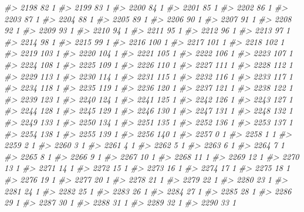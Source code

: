 \documentclass[]{article}
\newenvironment{Shaded}{\begin{snugshade}}{\end{snugshade}}
\newcommand{\CommentTok}[1]{\textcolor[rgb]{0.56,0.35,0.01}{\textit{#1}}}
\begin{document}
\begin{Shaded}
\begin{Highlighting}[]
\CommentTok{#> 2198  82  1}
\CommentTok{#> 2199  83  1}
\CommentTok{#> 2200  84  1}
\CommentTok{#> 2201  85  1}
\CommentTok{#> 2202  86  1}
\CommentTok{#> 2203  87  1}
\CommentTok{#> 2204  88  1}
\CommentTok{#> 2205  89  1}
\CommentTok{#> 2206  90  1}
\CommentTok{#> 2207  91  1}
\CommentTok{#> 2208  92  1}
\CommentTok{#> 2209  93  1}
\CommentTok{#> 2210  94  1}
\CommentTok{#> 2211  95  1}
\CommentTok{#> 2212  96  1}
\CommentTok{#> 2213  97  1}
\CommentTok{#> 2214  98  1}
\CommentTok{#> 2215  99  1}
\CommentTok{#> 2216 100  1}
\CommentTok{#> 2217 101  1}
\CommentTok{#> 2218 102  1}
\CommentTok{#> 2219 103  1}
\CommentTok{#> 2220 104  1}
\CommentTok{#> 2221 105  1}
\CommentTok{#> 2222 106  1}
\CommentTok{#> 2223 107  1}
\CommentTok{#> 2224 108  1}
\CommentTok{#> 2225 109  1}
\CommentTok{#> 2226 110  1}
\CommentTok{#> 2227 111  1}
\CommentTok{#> 2228 112  1}
\CommentTok{#> 2229 113  1}
\CommentTok{#> 2230 114  1}
\CommentTok{#> 2231 115  1}
\CommentTok{#> 2232 116  1}
\CommentTok{#> 2233 117  1}
\CommentTok{#> 2234 118  1}
\CommentTok{#> 2235 119  1}
\CommentTok{#> 2236 120  1}
\CommentTok{#> 2237 121  1}
\CommentTok{#> 2238 122  1}
\CommentTok{#> 2239 123  1}
\CommentTok{#> 2240 124  1}
\CommentTok{#> 2241 125  1}
\CommentTok{#> 2242 126  1}
\CommentTok{#> 2243 127  1}
\CommentTok{#> 2244 128  1}
\CommentTok{#> 2245 129  1}
\CommentTok{#> 2246 130  1}
\CommentTok{#> 2247 131  1}
\CommentTok{#> 2248 132  1}
\CommentTok{#> 2249 133  1}
\CommentTok{#> 2250 134  1}
\CommentTok{#> 2251 135  1}
\CommentTok{#> 2252 136  1}
\CommentTok{#> 2253 137  1}
\CommentTok{#> 2254 138  1}
\CommentTok{#> 2255 139  1}
\CommentTok{#> 2256 140  1}
\CommentTok{#> 2257   0  1}
\CommentTok{#> 2258   1  1}
\CommentTok{#> 2259   2  1}
\CommentTok{#> 2260   3  1}
\CommentTok{#> 2261   4  1}
\CommentTok{#> 2262   5  1}
\CommentTok{#> 2263   6  1}
\CommentTok{#> 2264   7  1}
\CommentTok{#> 2265   8  1}
\CommentTok{#> 2266   9  1}
\CommentTok{#> 2267  10  1}
\CommentTok{#> 2268  11  1}
\CommentTok{#> 2269  12  1}
\CommentTok{#> 2270  13  1}
\CommentTok{#> 2271  14  1}
\CommentTok{#> 2272  15  1}
\CommentTok{#> 2273  16  1}
\CommentTok{#> 2274  17  1}
\CommentTok{#> 2275  18  1}
\CommentTok{#> 2276  19  1}
\CommentTok{#> 2277  20  1}
\CommentTok{#> 2278  21  1}
\CommentTok{#> 2279  22  1}
\CommentTok{#> 2280  23  1}
\CommentTok{#> 2281  24  1}
\CommentTok{#> 2282  25  1}
\CommentTok{#> 2283  26  1}
\CommentTok{#> 2284  27  1}
\CommentTok{#> 2285  28  1}
\CommentTok{#> 2286  29  1}
\CommentTok{#> 2287  30  1}
\CommentTok{#> 2288  31  1}
\CommentTok{#> 2289  32  1}
\CommentTok{#> 2290  33  1}

\end{Highlighting}
\end{Shaded}
\end{document}
